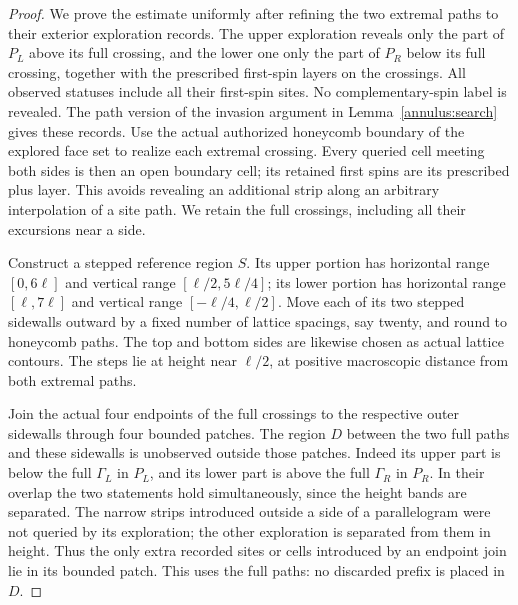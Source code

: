 \begin{proof}
We prove the estimate uniformly after refining the two extremal paths
to their exterior exploration records.  The upper exploration reveals
only the part of $P_L$ above its full crossing, and the lower one only
the part of $P_R$ below its full crossing, together with the prescribed
first-spin layers on the crossings.  All observed statuses include
all their first-spin sites.  No complementary-spin label is revealed.
The path version of the invasion argument in
Lemma~\ref{annulus:search} gives these records.  Use the actual
authorized honeycomb boundary of the explored face set to realize each
extremal crossing.  Every queried cell meeting both sides is then an
open boundary cell; its retained first spins are its prescribed plus
layer.  This avoids revealing an additional strip along an arbitrary
interpolation of a site path.  We retain the full crossings, including
all their excursions near a side.

Construct a stepped reference region $S$.  Its upper portion has
horizontal range $[0,6\ell]$ and vertical range
$[\ell/2,5\ell/4]$; its lower portion has horizontal range
$[\ell,7\ell]$ and vertical range $[-\ell/4,\ell/2]$.
Move each of its two stepped sidewalls outward by a fixed number of
lattice spacings, say twenty, and round to honeycomb paths.  The top
and bottom sides are likewise chosen as actual lattice contours.
The steps lie at height near $\ell/2$, at positive macroscopic distance
from both extremal paths.

Join the actual four endpoints of the full crossings to the respective
outer sidewalls through four bounded patches.  The region $D$ between
the two full paths and these sidewalls is unobserved outside those
patches.  Indeed its upper part is below the full $\Gamma_L$ in $P_L$,
and its lower part is above the full $\Gamma_R$ in $P_R$.  In their
overlap the two statements hold simultaneously, since the height bands
are separated.  The narrow strips introduced outside a side of a
parallelogram were not queried by its exploration; the other exploration
is separated from them in height.  Thus the only extra recorded sites
or cells introduced by an endpoint join lie in its bounded patch.
This uses the full paths: no discarded prefix is placed in $D$.


\end{proof}
